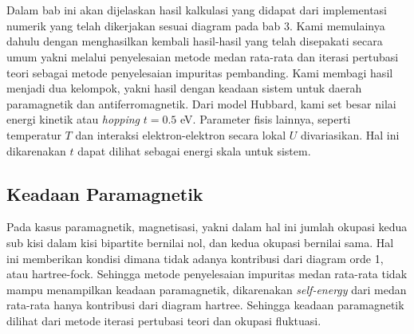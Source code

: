 \chapter{\babEmpat}
Dalam bab ini akan dijelaskan hasil kalkulasi yang didapat dari implementasi numerik yang telah dikerjakan sesuai diagram pada bab 3. Kami memulainya dahulu dengan menghasilkan kembali hasil-hasil yang telah disepakati secara umum yakni melalui penyelesaian metode medan rata-rata dan iterasi pertubasi teori sebagai metode penyelesaian impuritas pembanding. Kami membagi hasil menjadi dua kelompok, yakni hasil dengan keadaan sistem untuk daerah paramagnetik dan antiferromagnetik. Dari model Hubbard, kami set besar nilai energi kinetik atau \textit{hopping} $t = 0.5$ eV. Parameter fisis lainnya, seperti temperatur $T$ dan interaksi elektron-elektron secara lokal $U$ divariasikan. Hal ini dikarenakan $t$ dapat dilihat sebagai energi skala untuk sistem.

\section{Keadaan Paramagnetik}
Pada kasus paramagnetik, magnetisasi, yakni dalam hal ini jumlah okupasi kedua sub kisi dalam kisi bipartite bernilai nol, dan kedua okupasi bernilai sama. Hal ini memberikan kondisi dimana tidak adanya kontribusi dari diagram orde 1, atau hartree-fock. Sehingga metode penyelesaian impuritas medan rata-rata tidak mampu menampilkan keadaan paramagnetik, dikarenakan \textit{self-energy} dari medan rata-rata hanya kontribusi dari diagram hartree. Sehingga keadaan paramagnetik dilihat dari metode iterasi pertubasi teori dan okupasi fluktuasi.

